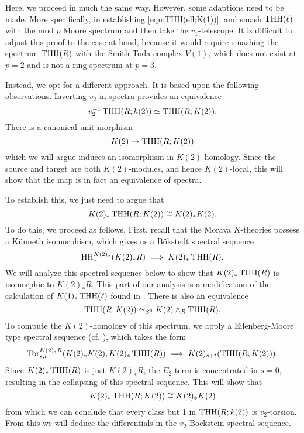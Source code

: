 Here, we proceed in much the same way. However, some adaptions need to be made. More specifically, in establishing \eqref{eqn:THH(ell;K(1))}, \cite{AngeltveitRognes} and \cite{McClureStaffeldt} smash $\operatorname{THH}(\ell)$ with the mod $p$ Moore spectrum and then take the $v_1$-telescope. It is difficult to adjust this proof to the case at hand, because it would require smashing the spectrum $\operatorname{THH}(R)$ with the Smith-Toda complex $V(1)$, which does not exist at $p=2$ and is not a ring spectrum at $p=3$. 

Instead, we opt for a different approach. It is based upon the following observations. Inverting $v_2$ in spectra 
provides an equivalence
\[
v_2^{-1}\operatorname{THH}(R;k(2))\simeq \operatorname{THH}(R;K(2)). 
\]
There is a canonical unit morphism 
\[
K(2)\to \operatorname{THH}(R;K(2))
\]
which we will argue induces an isomorphism in $K(2)$-homology. Since the source and target are both $K(2)$-modules, and hence $K(2)$-local, this will show that the map is in fact an equivalence of spectra.

To establish this, we just need to argue that 
\[
K(2)_*\operatorname{THH}(R;K(2))\cong K(2)_*K(2). 
\]
To do this, we proceed as follows. First, recall that the Morava $K$-theories possess a K\"unneth isomorphism, which gives us a B\"okstedt spectral sequence 
\begin{equation}\label{eqn:K(2)Bokstedt}
\operatorname{HH}_*^{K(2)_*}(K(2)_*R)\implies K(2)_*\operatorname{THH}(R).
\end{equation}
We will analyze this spectral sequence below to show that $K(2)_*\operatorname{THH}(R)$ is isomorphic to $K(2)_*R$. This part of our analysis is a modification of the calculation of $K(1)_*\operatorname{THH}(\ell)$ found in \cite{McClureStaffeldt}. There is also an equivalence
\[
\operatorname{THH}(R;K(2))\simeq_{S^0} K(2)\wedge_R\operatorname{THH}(R).
\]
To compute the $K(2)$-homology of this spectrum, we apply a Eilenberg-Moore type spectral sequence (cf. \cite[IV, 6.4]{EKMM}), which takes the form 
\[
\operatorname{Tor}^{K(2)_*R}_{s,t}(K(2)_*K(2), K(2)_*\operatorname{THH}(R))\implies K(2)_{s+t}(\operatorname{THH}(R;K(2))).
\]
Since $K(2)_*\operatorname{THH}(R)$ is just $K(2)_*R$, the $E_2$-term is concentrated in $s=0$, resulting in the collapsing of this spectral sequence. This will show that 
\[
K(2)_*\operatorname{THH}(R;K(2))\cong K(2)_*K(2)
\]
from which we can conclude that every class but 1 in $\operatorname{THH}(R;k(2))$ is $v_2$-torsion. From this we will deduce the differentials in the $v_2$-Bockstein spectral sequence. 

 
